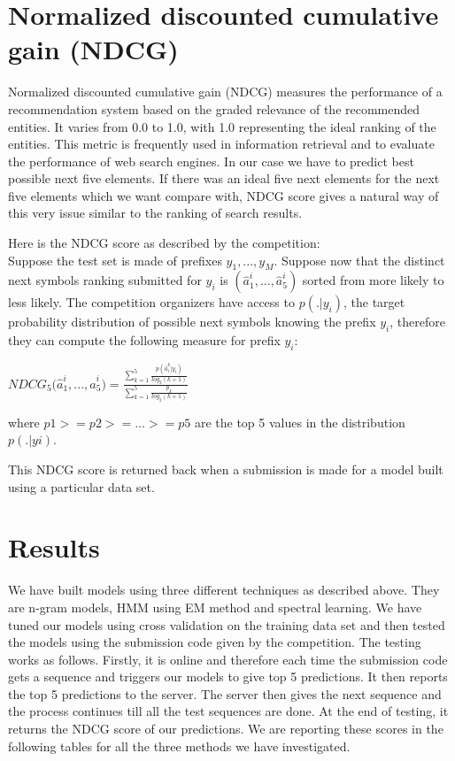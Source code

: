 \documentclass{article} %
\begin{document}
\section{Normalized discounted cumulative gain (NDCG)}
Normalized discounted cumulative gain (NDCG) measures the performance of a recommendation system based on the graded relevance of the recommended entities. It varies from 0.0 to 1.0, with 1.0 representing the ideal ranking of the entities. This metric is frequently used in information retrieval and to evaluate the performance of web search engines. In our case we have to predict best possible next five elements. If there was an ideal five next elements for the next five elements which we want compare with, NDCG score gives a natural way of this very issue similar to the ranking of search results.

Here is the NDCG score as described by the competition:\\
Suppose the test set is made of prefixes $y_1, ..., y_M$. Suppose now that the distinct next symbols ranking submitted for $y_i$ is $(\hat{a}_1^i, ..., \hat{a}_5^i)$ sorted from more likely to less likely. The competition organizers have access to $p(.|y_i)$, the target probability distribution of possible next symbols knowing the prefix $y_i$, therefore they can compute the following measure for prefix $y_i$:

$NDCG_5\big(\hat{a}_1^i, ..., \hat{a}_5^i\big) = \frac{\sum\limits_{k=1}^5 \frac{p(\hat{a}_i^k|y_i)}{log_2(k+1)}}{\sum\limits_{k=1}^5 \frac{p_k}{log_2(k+1)}}$

where $p1 >= p2 >= ... >= p5$ are the top 5 values in the distribution $p(.|yi)$.

This NDCG score is returned back when a submission is made for a model built using a particular data set.

\section{Results}
We have built models using three different techniques as described above. They are n-gram models, HMM using EM method and spectral learning. We have tuned our models using cross validation on the training data set and then tested the models using the submission code given by the competition. The testing works as follows. Firstly, it is online and therefore each time the submission code gets a sequence and triggers our models to give top 5 predictions. It then reports the top 5 predictions to the server. The server then gives the next sequence and the process continues till all the test sequences are done. At the end of testing, it returns the NDCG score of our predictions. We are reporting these scores in the following tables for all the three methods we have investigated.
\end{document}
